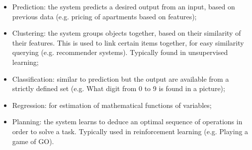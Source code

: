 \begin{itemize}
\item{Prediction: the system predicts a desired output from an input, based on previous data (e.g. pricing of apartments based on features);}
\item{Clustering: the system groups objects together, based on their similarity of their features. This is used to link certain items together, for easy similarity querying (e.g. recommender systems). Typically found in unsupervised learning;}
\item{Classification: similar to prediction but the output are available from a strictly defined set (e.g. What digit from 0 to 9 is found in a picture);}
\item{Regression: for estimation of mathematical functions of variables;}
\item{Planning: the system learns to deduce an optimal sequence of operations in order to solve a task. Typically used in reinforcement learning (e.g. Playing a game of GO).}
\end{itemize}



